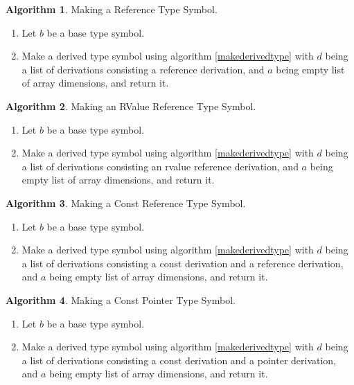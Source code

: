 \documentclass[a4paper,oneside,11pt]{book}
\theoremstyle{definition}
\newtheorem{algo}{Algorithm}[section]
\begin{document}
\begin{algo}\label{makereferencetype} Making a Reference Type Symbol.
\begin{enumerate}
\item
Let $b$ be a base type symbol.
\item
Make a derived type symbol using algorithm \ref{makederivedtype} with $d$ being a list of derivations consisting a reference derivation,
and $a$ being empty list of array dimensions, and return it.
\end{enumerate}
\end{algo}

\begin{algo}\label{makervaluereftype} Making an RValue Reference Type Symbol.
\begin{enumerate}
\item
Let $b$ be a base type symbol.
\item
Make a derived type symbol using algorithm \ref{makederivedtype} with $d$ being a list of derivations consisting an rvalue reference derivation,
and $a$ being empty list of array dimensions, and return it.
\end{enumerate}
\end{algo}

\begin{algo}\label{makeconstreftype} Making a Const Reference Type Symbol.
\begin{enumerate}
\item
Let $b$ be a base type symbol.
\item
Make a derived type symbol using algorithm \ref{makederivedtype} with $d$ being a list of derivations consisting a const derivation and a reference derivation,
and $a$ being empty list of array dimensions, and return it.
\end{enumerate}
\end{algo}

\begin{algo}\label{makeconstpointertype} Making a Const Pointer Type Symbol.
\begin{enumerate}
\item
Let $b$ be a base type symbol.
\item
Make a derived type symbol using algorithm \ref{makederivedtype} with $d$ being a list of derivations consisting a const derivation and a pointer derivation,
and $a$ being empty list of array dimensions, and return it.
\end{enumerate}
\end{algo}
\end{document}
